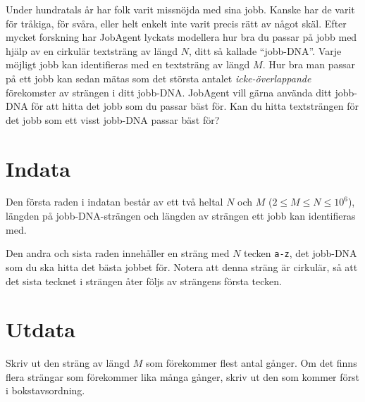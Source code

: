 Under hundratals år har folk varit missnöjda med sina jobb.
Kanske har de varit för tråkiga, för svåra, eller helt enkelt inte varit precis rätt av något skäl.
Efter mycket forskning har JobAgent lyckats modellera hur bra du passar på jobb med hjälp av en cirkulär textsträng av längd $N$, ditt så kallade ``jobb-DNA''.
Varje möjligt jobb kan identifieras med en textsträng av längd $M$.
Hur bra man passar på ett jobb kan sedan mätas som det största antalet \emph{icke-överlappande} förekomster av strängen i ditt jobb-DNA.
JobAgent vill gärna använda ditt jobb-DNA för att hitta det jobb som du passar bäst för.
Kan du hitta textsträngen för det jobb som ett visst jobb-DNA passar bäst för?

\section*{Indata}
Den första raden i indatan består av ett två heltal $N$ och $M$ ($2 \le M \le N \le 10^6$), längden på jobb-DNA-strängen och längden av strängen ett jobb kan identifieras med.

Den andra och sista raden innehåller en sträng med $N$ tecken \texttt{a-z}, det jobb-DNA som du ska hitta det bästa jobbet för.
Notera att denna sträng är cirkulär, så att det sista tecknet i strängen åter följs av strängens första tecken.

\section*{Utdata}
Skriv ut den sträng av längd $M$ som förekommer flest antal gånger.
Om det finns flera strängar som förekommer lika många gånger, skriv ut den som kommer först i bokstavsordning.
